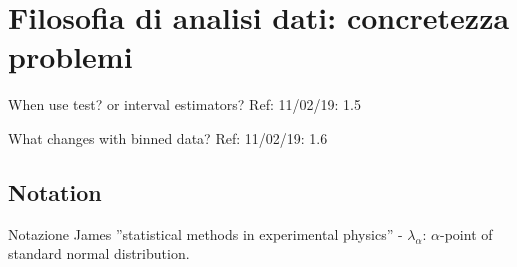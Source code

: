 \section{Filosofia di analisi dati: concretezza problemi}

\begin{frame}{When use test? or interval estimators?}\frameintoc
Ref: 11/02/19: 1.5
\end{frame}

\begin{frame}{What changes with binned data?}
Ref: 11/02/19: 1.6
\end{frame}

\subsection{Notation}

\begin{frame}{}
Notazione James ''statistical methods in experimental physics'' - $\lambda_{\alpha}$: $\alpha$-point of standard normal distribution.
\end{frame}